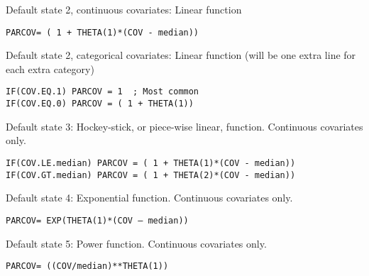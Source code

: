 Default state 2, continuous covariates: Linear function
\begin{verbatim}
PARCOV= ( 1 + THETA(1)*(COV - median))
\end{verbatim}

Default state 2, categorical covariates: Linear function (will be one extra line for each extra category)
\begin{verbatim}
IF(COV.EQ.1) PARCOV = 1  ; Most common
IF(COV.EQ.0) PARCOV = ( 1 + THETA(1))
\end{verbatim}

Default state 3: Hockey-stick, or piece-wise linear, function. Continuous covariates only.
\begin{verbatim}
IF(COV.LE.median) PARCOV = ( 1 + THETA(1)*(COV - median))
IF(COV.GT.median) PARCOV = ( 1 + THETA(2)*(COV - median))
\end{verbatim}

Default state 4: Exponential function. Continuous covariates only.
\begin{verbatim}
PARCOV= EXP(THETA(1)*(COV – median))
\end{verbatim}

Default state 5: Power function. Continuous covariates only.
\begin{verbatim}
PARCOV= ((COV/median)**THETA(1))
\end{verbatim}



